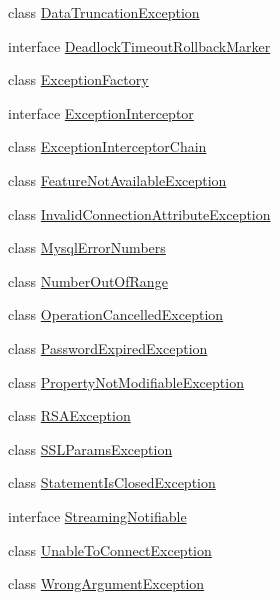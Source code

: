 \begin{DoxyCompactItemize}
class \mbox{\hyperlink{classcom_1_1mysql_1_1cj_1_1exceptions_1_1_data_truncation_exception}{Data\+Truncation\+Exception}}
\item 
interface \mbox{\hyperlink{interfacecom_1_1mysql_1_1cj_1_1exceptions_1_1_deadlock_timeout_rollback_marker}{Deadlock\+Timeout\+Rollback\+Marker}}
\item 
class \mbox{\hyperlink{classcom_1_1mysql_1_1cj_1_1exceptions_1_1_exception_factory}{Exception\+Factory}}
\item 
interface \mbox{\hyperlink{interfacecom_1_1mysql_1_1cj_1_1exceptions_1_1_exception_interceptor}{Exception\+Interceptor}}
\item 
class \mbox{\hyperlink{classcom_1_1mysql_1_1cj_1_1exceptions_1_1_exception_interceptor_chain}{Exception\+Interceptor\+Chain}}
\item 
class \mbox{\hyperlink{classcom_1_1mysql_1_1cj_1_1exceptions_1_1_feature_not_available_exception}{Feature\+Not\+Available\+Exception}}
\item 
class \mbox{\hyperlink{classcom_1_1mysql_1_1cj_1_1exceptions_1_1_invalid_connection_attribute_exception}{Invalid\+Connection\+Attribute\+Exception}}
\item 
class \mbox{\hyperlink{classcom_1_1mysql_1_1cj_1_1exceptions_1_1_mysql_error_numbers}{Mysql\+Error\+Numbers}}
\item 
class \mbox{\hyperlink{classcom_1_1mysql_1_1cj_1_1exceptions_1_1_number_out_of_range}{Number\+Out\+Of\+Range}}
\item 
class \mbox{\hyperlink{classcom_1_1mysql_1_1cj_1_1exceptions_1_1_operation_cancelled_exception}{Operation\+Cancelled\+Exception}}
\item 
class \mbox{\hyperlink{classcom_1_1mysql_1_1cj_1_1exceptions_1_1_password_expired_exception}{Password\+Expired\+Exception}}
\item 
class \mbox{\hyperlink{classcom_1_1mysql_1_1cj_1_1exceptions_1_1_property_not_modifiable_exception}{Property\+Not\+Modifiable\+Exception}}
\item 
class \mbox{\hyperlink{classcom_1_1mysql_1_1cj_1_1exceptions_1_1_r_s_a_exception}{R\+S\+A\+Exception}}
\item 
class \mbox{\hyperlink{classcom_1_1mysql_1_1cj_1_1exceptions_1_1_s_s_l_params_exception}{S\+S\+L\+Params\+Exception}}
\item 
class \mbox{\hyperlink{classcom_1_1mysql_1_1cj_1_1exceptions_1_1_statement_is_closed_exception}{Statement\+Is\+Closed\+Exception}}
\item 
interface \mbox{\hyperlink{interfacecom_1_1mysql_1_1cj_1_1exceptions_1_1_streaming_notifiable}{Streaming\+Notifiable}}
\item 
class \mbox{\hyperlink{classcom_1_1mysql_1_1cj_1_1exceptions_1_1_unable_to_connect_exception}{Unable\+To\+Connect\+Exception}}
\item 
class \mbox{\hyperlink{classcom_1_1mysql_1_1cj_1_1exceptions_1_1_wrong_argument_exception}{Wrong\+Argument\+Exception}}
\end{DoxyCompactItemize}
